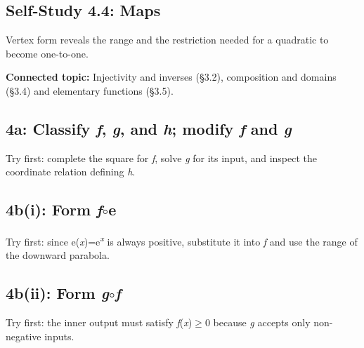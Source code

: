 \documentclass[11pt]{article}
\begin{document}
\begin{keepsection}
\section{Self-Study 4.4: Maps}

Vertex form reveals the range and the restriction needed for a quadratic to become one-to-one.

\textbf{Connected topic:} Injectivity and inverses (§3.2), composition and domains (§3.4) and elementary functions (§3.5).

\begin{keepsection}
\subsection{4a: Classify \textit{f}, \textit{g}, and \textit{h}; modify \textit{f} and \textit{g}}

Try first: complete the square for \textit{f}, solve \textit{g} for its input, and inspect the coordinate relation defining \textit{h}.

\end{keepsection}

\begin{keepsection}
\subsection{4b(i): Form \textit{f}\ensuremath{\circ}e}

Try first: since e(\textit{x})=e\textsuperscript{\textit{x}} is always positive, substitute it into \textit{f} and use the range of the downward parabola.

\end{keepsection}

\begin{keepsection}
\subsection{4b(ii): Form \textit{g}\ensuremath{\circ}\textit{f}}

Try first: the inner output must satisfy \textit{f}(\textit{x})\ensuremath{\geq}0 because \textit{g} accepts only non-negative inputs.


\end{keepsection}
\end{keepsection}
\end{document}
